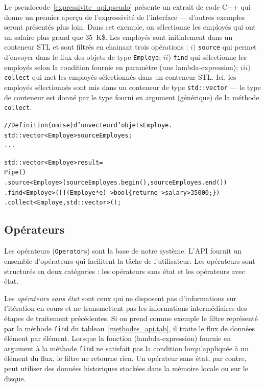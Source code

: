 Le pseudocode~\ref{expressivite_api.pseudo} pr\'esente un extrait de code C++ qui donne un premier aper\c{c}u de l'expressivit\'e de l'interface --- d'autres exemples seront pr\'esent\'es plus loin. Dans cet exemple, on s\'electionne les employ\'es qui ont un salaire plus grand que 35~K\$. Les employ\'es sont initialement dans un conteneur STL et sont filtr\'es en chainant trois op\'erations : $i)$ \texttt{source} qui permet d'envoyer dans le flux des objets de type \texttt{Employe}; $ii$) \texttt{find} qui s\'electionne les employ\'es selon la condition fournie en param\`etre (une lambda-expression); $iii)$ \texttt{collect} qui met les employ\'es s\'electionn\'es dans un conteneur STL. Ici, les employ\'es s\'electionn\'es sont mis dans un conteneur de type \texttt{std::vector} --- le type de conteneur est donn\'e par le type fourni en argument (g\'en\'erique) de la m\'ethode \texttt{collect}.


\begin{pseudocode}
{\small
\begin{alltt}
// Definition (omise) d'un vecteur d'objets Employe.
std::vector<Employe> sourceEmployes;
...

std::vector<Employe> result = 
        Pipe()
        .source<Employe>(sourceEmployes.begin(), sourceEmployes.end())
        .find<Employe>([](Employe *e) -> bool \{ return e->salary > 35000; \})
        .collect<Employe, std::vector>();

\end{alltt}
}
\caption{Un exemple illustrant l'\'expressivit\'e de l'API de \ppff.}
\label{expressivite_api.pseudo}
\end{pseudocode}




\subsection{Op\'erateurs}

Les op\'erateurs (\texttt{Operator}s) sont la base de notre syst\`eme. L'API fournit un ensemble d'op\'erateurs qui facilitent la t\^ache de l'utilisateur. Les op\'erateurs sont structur\'es en deux cat\'egories : les op\'erateurs sans \'etat et les op\'erateurs avec \'etat.

Les \emph{op\'erateurs sans \'etat} sont ceux qui ne disposent pas d'informations sur l'it\'eration en cours et ne transmettent pas les informations interm\'ediaires des \'etapes de traitement pr\'ec\'edentes. Si on prend comme exemple le filtre repr\'esent\'e par la m\'ethode \texttt{find} du tableau~\ref{methodes_api.tab}, il traite le flux de donn\'ees \'el\'ement par \'el\'ement. 
%
Lorsque la fonction (lambda-expression) fournie en argument \`a la m\'ethode \texttt{find} ne satisfait pas la condition lorqu'appliqu\'ee \`a un \'el\'ement du flux, le filtre ne retourne rien. Un op\'erateur sans \'etat, par contre, peut utiliser des donn\'ees historiques stock\'ees dans la m\'emoire locale ou sur le disque.

